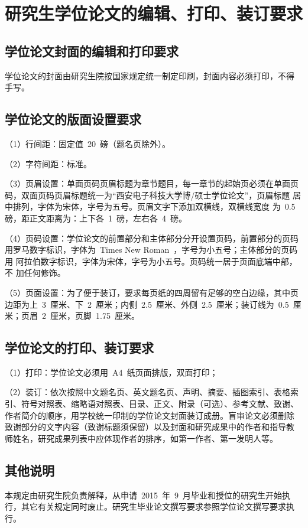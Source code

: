 
\chapter{研究生学位论文的编辑、打印、装订要求}

\section{学位论文封面的编辑和打印要求}

学位论文的封面由研究生院按国家规定统一制定印刷，封面内容必须打印，不得
手写。

\section{学位论文的版面设置要求}

（1）行间距：固定值~20~磅（题名页除外）。

（2）字符间距：标准。

（3）页眉设置：单面页码页眉标题为章节题目，每一章节的起始页必须在单面页
码，双面页码页眉标题统一为“西安电子科技大学博/硕士学位论文”，页眉标题
居中排列，字体为宋体，字号为五号。页眉文字下添加双横线，双横线宽度
为~0.5~ 磅，距正文距离为：上下各~1~磅，左右各~4~磅。

（4）页码设置：学位论文的前置部分和主体部分分开设置页码，前置部分的页码
用罗马数字标识，字体为~Times New Roman~，字号为小五号；主体部分的页码用
阿拉伯数字标识，字体为宋体，字号为小五号。页码统一居于页面底端中部，不
加任何修饰。

（5）页面设置：为了便于装订，要求每页纸的四周留有足够的空白边缘，其中页
边距为上~3~厘米、下~2~厘米；内侧~2.5~厘米、外侧~2.5~厘米；装订线为~0.5~厘
米；页眉~2~厘米，页脚~1.75~厘米。

\section{学位论文的打印、装订要求}

（1）打印：学位论文必须用~A4~纸页面排版，双面打印；

（2）装订：依次按照中文题名页、英文题名页、声明、摘要、插图索引、表格索
引、符号对照表、缩略语对照表、目录、正文、附录（可选）、参考文献、致谢、
作者简介的顺序，用学校统一印制的学位论文封面装订成册。盲审论文必须删除
致谢部分的文字内容（致谢标题须保留）以及封面和研究成果中的作者和指导教
师姓名，研究成果列表中应体现作者的排序，如第一作者、第一发明人等。

\section{其他说明}

本规定由研究生院负责解释，从申请~2015~年~9~月毕业和授位的研究生开始执行，其它有关规定同时废止。研究生毕业论文撰写要求参照学位论文撰写要求执行。
